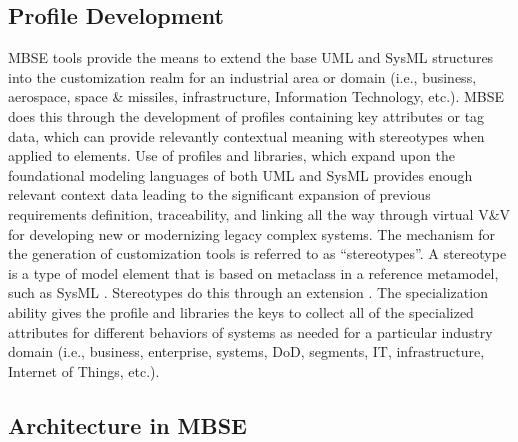 \documentclass[num-refs]{wiley-article}
\begin{document}
\subsection{Profile Development}
\label{Profile Development}

MBSE tools provide the means to extend the base UML and SysML structures into the customization realm for an industrial area or domain (i.e., business, aerospace, space \& missiles, infrastructure, Information Technology, etc.). MBSE does this through the development of profiles containing key attributes or tag data, which can provide relevantly contextual meaning with stereotypes when applied to elements. Use of profiles and libraries, which expand upon the foundational modeling languages of both UML and SysML provides enough relevant context data leading to the significant expansion of previous requirements definition, traceability, and linking all the way through virtual V\&V for developing new or modernizing legacy complex systems. The mechanism for the generation of customization tools is referred to as ``stereotypes''. A stereotype is a type of model element that is based on metaclass in a reference metamodel, such as SysML \cite{Friedenthal2008}. Stereotypes do this through an extension \cite{Friedenthal2008}. The specialization ability gives the profile and libraries the keys to collect all of the specialized attributes for different behaviors of systems as needed for a particular industry domain (i.e., business, enterprise, systems, DoD, segments, IT, infrastructure, Internet of Things, etc.).

\subsection{Architecture in MBSE}
\label{Architecture in MBSE}
\end{document}
